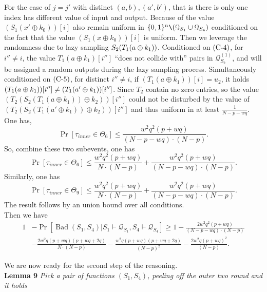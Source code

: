 For the case of $j=j'$ with distinct $(a,b),(a',b')$, that is there is only one index has different value of input and output. Because of the value $\left(S_{1}\left(x' \oplus k_{0}\right)\right)[i]$ also remain uniform in $\{0, 1\}^{n} \verb|\| (\mathcal{Q}_{S_{1}} \cup \mathcal{Q}_{S_{4}})$ conditioned on the fact that the value $\left(S_{1}\left(x \oplus k_{0}\right)\right)[i]$ is uniform. Then we leverage the randomness due to lazy sampling $S_2(T_1(a\oplus k_1))$. Conditioned on $\text{(C-4)}$, for $i''\neq i$, the value $T_1(a \oplus k_1)[i'']$ ``does not collide with'' pairs in $\mathcal{Q}_{S_{2}}^{(1)}$, and will be assigned a random outputs during the lazy sampling process. Simultaneously conditioned on $\text{(C-5)}$, for distinct $i'' \neq i$, if $(T_1\left(a \oplus k_{1}\right))[i] = u_2$, it holds $(T_1(a\oplus k_1))[i'']\neq(T_1(a'\oplus k_1))[i'']$. Since $T_2$ contain no zero entries, so the value $\left(T_{2}\left(S_{2}\left(T_1\left(a \oplus k_{1}\right)\right) \oplus k_{2}\right)\right)[i'']$ could not be disturbed by the value of $\left(T_{2}\left(S_{2}\left(T_1\left(a' \oplus k_{1}\right)\right) \oplus k_{2}\right)\right)[i'']$ and thus uniform in at least
$\frac{1}{N - p- wq}$. One has,
$$
\operatorname{Pr}\left[\tau_{inner} \in \Theta_{6}\right] \leq \frac{w^{2} q^{2} (p+w q)}{(N- p- wq) \cdot (N-p)}.
$$
\noindent So, combine these two subevents, one has
$$
\operatorname{Pr}\left[\tau_{inner} \in \Theta_{6}\right] \leq \frac{w^{2} q^{2} (p+w q)}{N \cdot (N-p)} + \frac{w^{2} q^{2} (p+w q)}{(N- p- wq) \cdot (N- p)}.
$$
\noindent Similarly, one has
$$
\operatorname{Pr}\left[\tau_{inner} \in \Theta_{9}\right] \leq \frac{w^{2} q^{2} (p+w q)}{N \cdot (N-p)} + \frac{w^{2} q^{2} (p+w q)}{(N- p- wq) \cdot (N-p)}.
$$
The result follows by an union bound over all conditions.\\

\noindent Then we have
$$
\begin{aligned}
1&-\operatorname{Pr}\left[\operatorname{Bad}\left(S_{1},S_{4}\right) | S_{1} \vdash \mathcal{Q}_{S_{1}},S_{4} \vdash \mathcal{Q}_{S_{4}}\right] \geq 1 - \frac{2 w^{2} q^{2} (p+w q)}{(N- p- wq) \cdot (N-p)}\\
& -\frac{2 w^{2} q (p+w q)(p+w q+2 q)}{N \cdot (N-p)} - \frac{w^{2} q (p+w q)(p+w q+2 q)}{(N-p)^2} - \frac{2 w^{2} q (p+w q)^{2}}{(N-p)}.
\end{aligned}
$$

We are now ready for the second step of the reasoning.\\

\noindent \textbf{Lemma 9} \emph{Pick a pair of functions $(S_{1}, S_{4})$, peeling off the outer two round and it holds}

